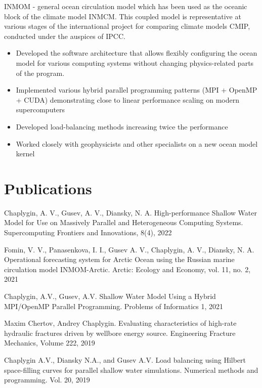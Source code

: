 \documentclass[10pt,a4paper]{moderncv}
\begin{document}
{INMOM - general ocean circulation model which has been used as the oceanic block of the climate model INMCM. This coupled model is representative at various stages of the international project for comparing climate models CMIP, conducted under the auspices of IPCC.
  \begin{itemize}
  \item Developed the software architecture that allows flexibly configuring the ocean model for various computing systems without changing physics-related parts of the program.
  \item Implemented various hybrid parallel programming patterns (MPI + OpenMP + CUDA) demonstrating close to linear performance scaling on modern supercomputers
  \item Developed load-balancing methods increasing twice the performance
  \item Worked closely with geophysicists and other specialists on a new ocean model kernel
  \end{itemize}
}



\section{Publications}

\cvlistitem
{Chaplygin, A. V., Gusev, A. V., Diansky, N. A. High-performance Shallow Water Model for Use on Massively Parallel and Heterogeneous Computing Systems. Supercomputing Frontiers and Innovations, 8(4), 2022}

\cvlistitem
{Fomin, V. V., Panasenkova, I. I., Gusev A. V., Chaplygin, A. V., Diansky, N. A. Operational forecasting system for Arctic Ocean using the Russian marine circulation model INMOM-Arctic. Arctic: Ecology and Economy, vol. 11, no. 2, 2021}

\cvlistitem
{Chaplygin, A.V., Gusev, A.V. Shallow Water Model Using a Hybrid MPI/OpenMP Parallel Programming. Problems of Informatics 1, 2021}

\cvlistitem
{Maxim Chertov, Andrey Chaplygin. Evaluating characteristics of high-rate hydraulic fractures driven by wellbore energy source. Engineering Fracture Mechanics, Volume 222, 2019}

\cvlistitem
{Chaplygin A.V., Diansky N.A., and Gusev A.V. Load balancing using Hilbert space-filling curves for parallel shallow water simulations. Numerical methods and programming. Vol. 20, 2019}
\end{document}
